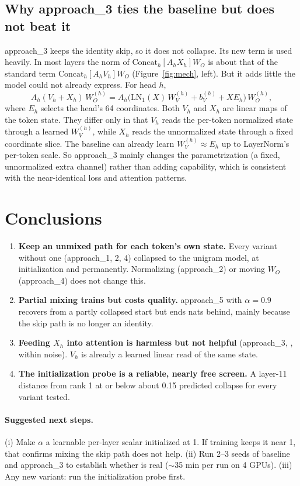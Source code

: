 \documentclass[11pt]{article}
\newcommand{\cat}{\mathrm{Concat}_h}
\begin{document}
\subsection{Why approach\_3 ties the baseline but does not beat it}
approach\_3 keeps the identity skip, so it does not collapse. Its new term is used heavily. In most layers the
norm of $\cat[A_hX_h]W_O$ is about that of the standard term $\cat[A_hV_h]W_O$ (Figure~\ref{fig:mech}, left). But it adds little the model
could not already express. For head $h$,
\[
A_h(V_h + X_h)\,W_O^{(h)} = A_h\big(\mathrm{LN}_1(X)\,W_V^{(h)} + b_V^{(h)} + X E_h\big)\,W_O^{(h)},
\]
where $E_h$ selects the head's 64 coordinates. Both $V_h$ and $X_h$ are linear maps of the token state. They differ
only in that $V_h$ reads the per-token normalized state through a learned $W_V^{(h)}$, while $X_h$ reads the
unnormalized state through a fixed coordinate slice. The baseline can already learn $W_V^{(h)}\approx E_h$ up to
LayerNorm's per-token scale. So approach\_3 mainly changes the parametrization (a fixed, unnormalized extra
channel) rather than adding capability, which is consistent with the near-identical loss and attention patterns.

\section{Conclusions}
\begin{enumerate}
\item \textbf{Keep an unmixed path for each token's own state.} Every variant without one (approach\_1, 2, 4)
collapsed to the unigram model, at initialization and permanently. Normalizing (approach\_2) or moving
$W_O$ (approach\_4) does not change this.
\item \textbf{Partial mixing trains but costs quality.} approach\_5 with $\alpha=0.9$ recovers from a partly collapsed
start but ends \FiveDelta{} nats behind, mainly because the skip path is no longer an identity.
\item \textbf{Feeding $X_h$ into attention is harmless but not helpful} (approach\_3, \ThreeDelta, within noise).
$V_h$ is already a learned linear read of the same state.
\item \textbf{The initialization probe is a reliable, nearly free screen.} A layer-11 distance from rank 1 at or
below about 0.15 predicted collapse for every variant tested.
\end{enumerate}

\paragraph{Suggested next steps.}
(i) Make $\alpha$ a learnable per-layer scalar initialized at 1. If training keeps it near 1, that confirms mixing the
skip path does not help. (ii) Run 2--3 seeds of baseline and approach\_3 to establish whether \ThreeDelta{} is real
($\sim$35 min per run on 4 GPUs). (iii) Any new variant: run the initialization probe first.
\end{document}
